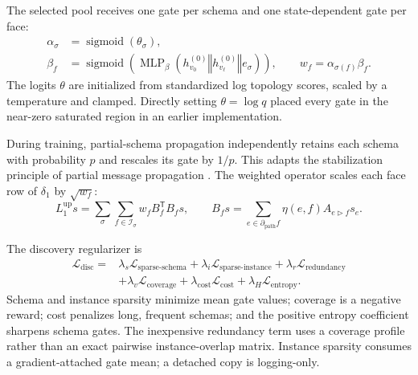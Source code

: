 \documentclass{article}
\newcommand{\cL}{\mathcal{L}}
\newcommand{\transpose}{\mathsf{T}}
\newcommand{\concat}{\mathbin\Vert}
\begin{document}
The selected pool receives one gate per schema and one state-dependent gate per face:
\begin{align}
  \alpha_\sigma &= \operatorname{sigmoid}(\theta_\sigma),\\
  \beta_f &= \operatorname{sigmoid}\!\left(
  \operatorname{MLP}_{\beta}
  (h_{v_0}^{(0)}\concat h_{v_\ell}^{(0)}\concat e_\sigma)
  \right),\qquad
  w_f=\alpha_{\sigma(f)}\beta_f.
  \label{eq:gates}
\end{align}
The logits $\theta$ are initialized from standardized log topology scores, scaled by a temperature
and clamped. Directly setting $\theta=\log q$ placed every gate in the near-zero saturated region
in an earlier implementation.

During training, partial-schema propagation independently retains each schema with probability
$p$ and rescales its gate by $1/p$. This adapts the stabilization principle of partial message
propagation \citep{jiang2022pmmm}. The weighted operator scales each face row of $\delta_1$ by
$\sqrt{w_f}$:
\begin{equation}
  L_1^{\mathrm{up}}s=
  \sum_{\sigma}\sum_{f\in\mathcal{I}_\sigma}
  w_f B_f^{\transpose}B_f s,\qquad
  B_f s=\sum_{e\in\partial_{\mathrm{path}}f}\eta(e,f)A_{e\triangleright f}s_e.
  \label{eq:weighted-up}
\end{equation}

The discovery regularizer is
\begin{equation}
  \begin{aligned}
  \cL_{\mathrm{disc}}={}&
  \lambda_s\cL_{\mathrm{sparse\text{-}schema}}+
  \lambda_i\cL_{\mathrm{sparse\text{-}instance}}+
  \lambda_r\cL_{\mathrm{redundancy}}\\
  &+\lambda_v\cL_{\mathrm{coverage}}+
  \lambda_{\mathrm{cost}}\cL_{\mathrm{cost}}+
  \lambda_H\cL_{\mathrm{entropy}}.
  \end{aligned}
  \label{eq:discovery-loss}
\end{equation}
Schema and instance sparsity minimize mean gate values; coverage is a negative reward; cost
penalizes long, frequent schemas; and the positive entropy coefficient sharpens schema gates. The
inexpensive redundancy term uses a coverage profile rather than an exact pairwise instance-overlap
matrix. Instance sparsity consumes a gradient-attached gate mean; a detached copy is logging-only.
\end{document}
